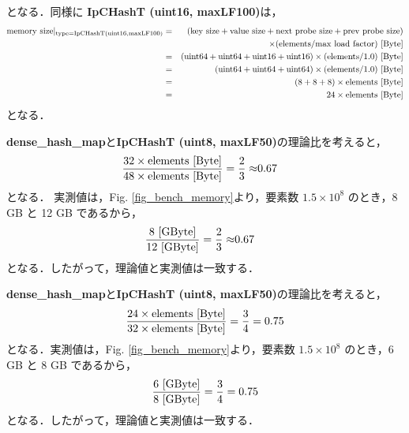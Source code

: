 となる．同様に {\bf IpCHashT (uint16, maxLF100)}は，
\begin{eqnarray*}
  {\rm memory\ size|_{type=IpCHashT (uint16, maxLF100)}} &=& ({\rm key\ size} + {\rm value\ size} + {\rm next\ probe\ size} + {\rm prev\ probe\ size})\\
                                              & & \times ({\rm elements} / {\rm max\ load\ factor}) {\rm\ [Byte]}\\
  &=& ({\rm uint64} + {\rm uint64} + {\rm uint16} + {\rm uint16}) \times ({\rm elements} / 1.0) {\rm\ [Byte]}\\
  &=& ({\rm uint64} + {\rm uint64} + {\rm uint64}) \times ({\rm elements} / 1.0) {\rm\ [Byte]}\\
  &=& (8 + 8 + 8) \times {\rm elements} {\rm\ [Byte]}\\
  &=& 24 \times {\rm elements} {\rm\ [Byte]}
\end{eqnarray*}
となる．

{\bf dense\_hash\_map}と{\bf IpCHashT (uint8, maxLF50)}の理論比を考えると，
\begin{eqnarray*}
  \frac{32 \times {\rm elements} {\rm\ [Byte]}}{48 \times {\rm elements} {\rm\ [Byte]}}
  = \frac{2}{3}\approx& 0.67
\end{eqnarray*}
となる．
実測値は，Fig. \ref{fig_bench_memory}より，要素数 $1.5\times 10^8$ のとき，8 GB と 12 GB であるから，
\begin{eqnarray*}
  \frac{8 {\rm\ [GByte]}}{12 {\rm\ [GByte]}}
  = \frac{2}{3}\approx& 0.67
\end{eqnarray*}
となる．したがって，理論値と実測値は一致する．

{\bf dense\_hash\_map}と{\bf IpCHashT (uint8, maxLF50)}の理論比を考えると，
\begin{eqnarray*}
  \frac{24 \times {\rm elements} {\rm\ [Byte]}}{32 \times {\rm elements} {\rm\ [Byte]}}
  = \frac{3}{4}= 0.75
\end{eqnarray*}
となる．実測値は，Fig. \ref{fig_bench_memory}より，要素数 $1.5\times 10^8$ のとき，6 GB と 8 GB であるから，
\begin{eqnarray*}
  \frac{6 {\rm\ [GByte]}}{8 {\rm\ [GByte]}}
  = \frac{3}{4}= 0.75
\end{eqnarray*}
となる．したがって，理論値と実測値は一致する．


